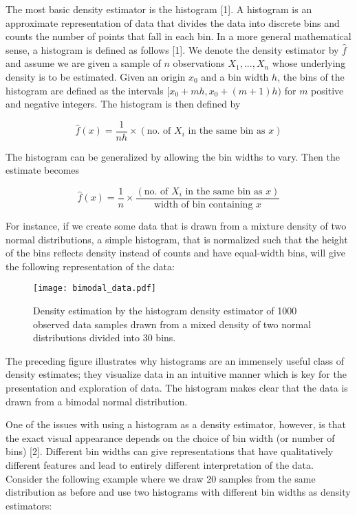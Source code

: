 The most basic density estimator is the histogram [1]. A histogram is an approximate representation of data that divides the data into discrete bins and counts the number of points that fall in each bin. In a more general mathematical sense, a histogram is defined as follows [1]. We denote the density estimator by $\hat{f}$ and assume we are given a sample of $n$ observations $X_1, ..., X_n$ whose underlying density is to be estimated. Given an origin $x_0$ and a bin width $h$, the bins of the histogram are defined as the intervals $[x_0 + mh, x_0 + (m+1)h)$ for $m$ positive and negative integers. The histogram is then defined by

\begin{equation*}
    \hat{f}(x) = \frac{1}{nh} \times (\text{no. of } X_i \text{ in the same bin as } x)
\end{equation*}

The histogram can be generalized by allowing the bin widths to vary. Then the estimate becomes 

\begin{equation*}
    \hat{f}(x) = \frac{1}{n} \times \frac{(\text{no. of } X_i \text{ in the same bin as } x)}{\text{width of bin containing }x}
\end{equation*}

For instance, if we create some data that is drawn from a mixture density of two normal distributions, a simple  histogram, that is normalized such that the height of the bins reflects density instead of counts and have equal-width bins, will give the following representation of the data: 

\begin{figure}[H]
    \centering
    \texttt{[image: bimodal\_data.pdf]}
    \caption{Density estimation by the histogram density estimator of 1000 observed data samples drawn from a mixed density of two normal distributions divided into 30 bins.}
    \label{fig:bimodal_data}
\end{figure}

The preceding figure illustrates why histograms are an immensely useful class of density estimates; they visualize data in an intuitive manner which is key for the presentation and exploration of data. The histogram makes clear that the data is drawn from a bimodal normal distribution.

One of the issues with using a histogram as a density estimator, however, is that the exact visual appearance depends on the choice of bin width (or number of bins) [2]. Different bin widths can give representations that have qualitatively different features and lead to entirely different interpretation of the data. Consider the following example where we draw 20 samples from the same distribution as before and use two histograms with different bin widths as density estimators:

